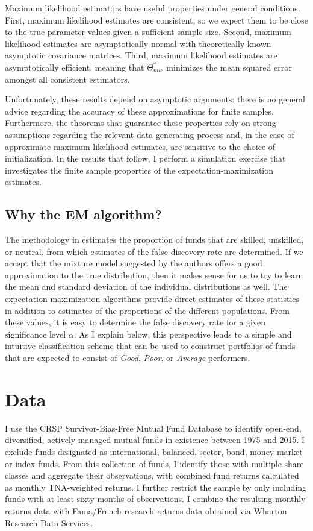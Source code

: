 		Maximum likelihood estimators have useful properties under general conditions. First, maximum likelihood estimates are consistent, so we expect them to be close to the true parameter values given a sufficient sample size. Second, maximum likelihood estimates are asymptotically normal with theoretically known asymptotic covariance matrices. Third, maximum likelihood estimates are asymptotically efficient, meaning that $\Theta_{mle}^*$ minimizes the mean squared error amongst all consistent estimators.

		Unfortunately, these results depend on asymptotic arguments: there is no general advice regarding the accuracy of these approximations for finite samples. Furthermore, the theorems that guarantee these properties rely on strong assumptions regarding the relevant data-generating process and, in the case of approximate maximum likelihood estimates, are sensitive to the choice of initialization.  In the results that follow, I perform a simulation exercise that investigates the finite sample properties of the expectation-maximization estimates.

	\subsection{Why the EM algorithm?}
		The methodology in \citet{Barras2010} estimates the proportion of funds that are skilled, unskilled, or neutral, from which estimates of the false discovery rate are determined. If we accept that the mixture model suggested by the authors offers a good approximation to the true distribution, then it makes sense for us to try to learn the mean and standard deviation of the individual distributions as well. The expectation-maximization algorithms provide direct estimates of these statistics in addition to estimates of the proportions of the different populations. From these values, it is easy to determine the false discovery rate for a given significance level $\alpha$. As I explain below, this perspective leads to a simple and intuitive classification scheme that can be used to construct portfolios of funds that are expected to consist of \textit{Good}, \textit{Poor}, or \textit{Average} performers.


\section{Data}
	I use the CRSP Survivor-Bias-Free Mutual Fund Database to identify open-end, diversified, actively managed mutual funds in existence between 1975 and 2015. I exclude funds designated as international, balanced, sector, bond, money market or index funds. From this collection of funds, I identify those with multiple share classes and aggregate their observations, with combined fund returns calculated as monthly TNA-weighted returns. I further restrict the sample by only including funds with at least sixty months of observations. I combine the resulting monthly returns data with Fama/French research returns data obtained via Wharton Research Data Services.

